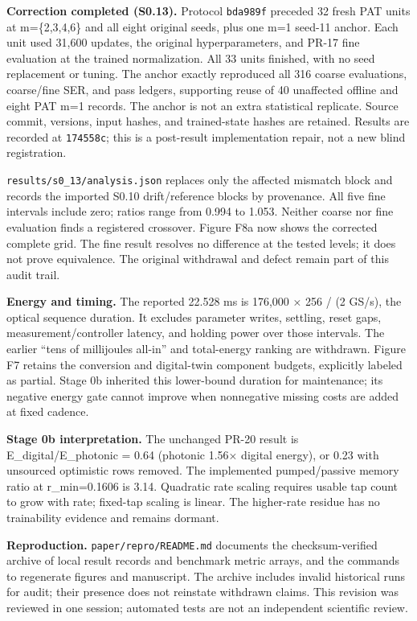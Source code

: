 \documentclass[
  10pt,
]{article}
\begin{document}
\textbf{Correction completed (S0.13).} Protocol \texttt{bda989f}
preceded 32 fresh PAT units at m=\{2,3,4,6\} and all eight original
seeds, plus one m=1 seed-11 anchor. Each unit used 31,600 updates, the
original hyperparameters, and PR-17 fine evaluation at the trained
normalization. All 33 units finished, with no seed replacement or
tuning. The anchor exactly reproduced all 316 coarse evaluations,
coarse/fine SER, and pass ledgers, supporting reuse of 40 unaffected
offline and eight PAT m=1 records. The anchor is not an extra
statistical replicate. Source commit, versions, input hashes, and
trained-state hashes are retained. Results are recorded at
\texttt{174558c}; this is a post-result implementation repair, not a new
blind registration.

\texttt{results/s0\_13/analysis.json} replaces only the affected
mismatch block and records the imported S0.10 drift/reference blocks by
provenance. All five fine intervals include zero; ratios range from
0.994 to 1.053. Neither coarse nor fine evaluation finds a registered
crossover. Figure F8a now shows the corrected complete grid. The fine
result resolves no difference at the tested levels; it does not prove
equivalence. The original withdrawal and defect remain part of this
audit trail.

\textbf{Energy and timing.} The reported 22.528 ms is 176,000 × 256 / (2
GS/s), the optical sequence duration. It excludes parameter writes,
settling, reset gaps, measurement/controller latency, and holding power
over those intervals. The earlier ``tens of millijoules all-in'' and
total-energy ranking are withdrawn. Figure F7 retains the conversion and
digital-twin component budgets, explicitly labeled as partial. Stage 0b
inherited this lower-bound duration for maintenance; its negative energy
gate cannot improve when nonnegative missing costs are added at fixed
cadence.

\textbf{Stage 0b interpretation.} The unchanged PR-20 result is
E\_digital/E\_photonic = 0.64 (photonic 1.56× digital energy), or 0.23
with unsourced optimistic rows removed. The implemented pumped/passive
memory ratio at r\_min=0.1606 is 3.14. Quadratic rate scaling requires
usable tap count to grow with rate; fixed-tap scaling is linear. The
higher-rate residue has no trainability evidence and remains dormant.

\textbf{Reproduction.} \texttt{paper/repro/README.md} documents the
checksum-verified archive of local result records and benchmark metric
arrays, and the commands to regenerate figures and manuscript. The
archive includes invalid historical runs for audit; their presence does
not reinstate withdrawn claims. This revision was reviewed in one
session; automated tests are not an independent scientific review.
\end{document}
